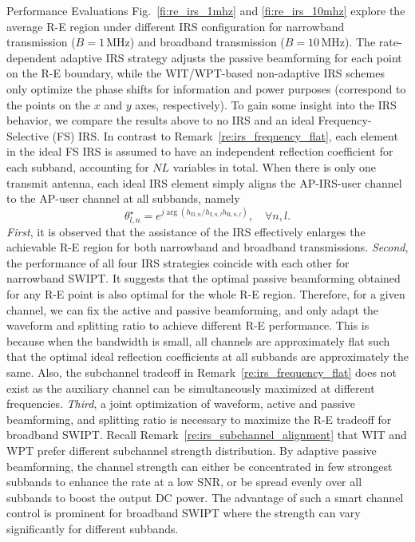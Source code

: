 \documentclass[journal]{IEEEtran}
\begin{document}
\begin{section}{Performance Evaluations}
		Fig.~\ref{fi:re_irs_1mhz} and \ref{fi:re_irs_10mhz} explore the average R-E region under different IRS configuration for narrowband transmission ($B=1\,\si{\MHz}$) and broadband transmission ($B=10\,\si{\MHz}$). The rate-dependent adaptive IRS strategy adjusts the passive beamforming for each point on the R-E boundary, while the WIT/WPT-based non-adaptive IRS schemes only optimize the phase shifts for information and power purposes (correspond to the points on the $x$ and $y$ axes, respectively). To gain some insight into the IRS behavior, we compare the results above to no IRS and an ideal Frequency-Selective (FS) IRS. In contrast to Remark~\ref{re:irs_frequency_flat}, each element in the ideal FS IRS is assumed to have an independent reflection coefficient for each subband, accounting for $NL$ variables in total. When there is only one transmit antenna, each ideal IRS element simply aligns the AP-IRS-user channel to the AP-user channel at all subbands, namely
		\begin{equation}
			\theta_{l,n}^{\star}=e^{j\arg{\left(h_{\mathrm{D},n}/h_{\mathrm{I},n,l}h_{\mathrm{R},n,l}\right)}},\quad \forall n,l.
		\end{equation}
		\textit{First}, it is observed that the assistance of the IRS effectively enlarges the achievable R-E region for both narrowband and broadband transmissions. \textit{Second}, the performance of all four IRS strategies coincide with each other for narrowband SWIPT. It suggests that the optimal passive beamforming obtained for any R-E point is also optimal for the whole R-E region. Therefore, for a given channel, we can fix the active and passive beamforming, and only adapt the waveform and splitting ratio to achieve different R-E performance. This is because when the bandwidth is small, all channels are approximately flat such that the optimal ideal reflection coefficients at all subbands are approximately the same. Also, the subchannel tradeoff in Remark~\ref{re:irs_frequency_flat} does not exist as the auxiliary channel can be simultaneously maximized at different frequencies. \textit{Third}, a joint optimization of waveform, active and passive beamforming, and splitting ratio is necessary to maximize the R-E tradeoff for broadband SWIPT. Recall Remark~\ref{re:irs_subchannel_alignment} that WIT and WPT prefer different subchannel strength distribution. By adaptive passive beamforming, the channel strength can either be concentrated in few strongest subbands to enhance the rate at a low SNR, or be spread evenly over all subbands to boost the output DC power. The advantage of such a smart channel control is prominent for broadband SWIPT where the strength can vary significantly for different subbands.
	\end{section}
\end{document}
